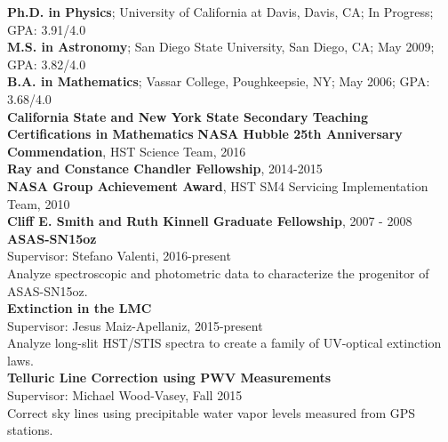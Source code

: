 \documentclass[10pt]{cv}
\begin{document}
\begin{llist}
\vspace{0.1in} 
   {\bf Ph.D. in Physics}; University of California at Davis, Davis, CA; In Progress; GPA: 3.91/4.0 \\
   {\bf M.S. in Astronomy}; San Diego State University, San Diego, CA; May 2009; GPA: 3.82/4.0 \\
   {\bf B.A. in Mathematics}; Vassar College, Poughkeepsie, NY; May 2006; GPA: 3.68/4.0 \\   
   {\bf California State and New York State Secondary Teaching Certifications in Mathematics} 
\vspace{-0.1in}   
{\bf NASA Hubble 25th Anniversary Commendation}, HST Science Team, 2016 \\ %
{\bf Ray and Constance Chandler Fellowship}, 2014-2015 \\
{\bf NASA Group Achievement Award}, HST SM4 Servicing Implementation Team, 2010 \\
{\bf Cliff E. Smith and Ruth Kinnell Graduate Fellowship}, 2007 - 2008 
% 
\vspace{-0.1in}   
{\bf ASAS-SN15oz} \hspace{179pt} \\
\hspace*{24pt}Supervisor: Stefano Valenti, 2016-present\\
\hspace*{24pt}Analyze spectroscopic and photometric data to characterize the progenitor of ASAS-SN15oz.\\
{\bf Extinction in the LMC}\hspace{149.95pt} \\
\hspace*{24pt}Supervisor: Jesus Maiz-Apellaniz, 2015-present\\
\hspace*{24pt}Analyze long-slit HST/STIS spectra to create a family of UV-optical extinction laws. \\
{\bf Telluric Line Correction using PWV Measurements} \hspace{2pt} \\
\hspace*{24pt}Supervisor: Michael Wood-Vasey, Fall 2015\\
\hspace*{24pt}Correct sky lines using precipitable water vapor levels measured from GPS stations. \\

\end{llist}
\end{document}
